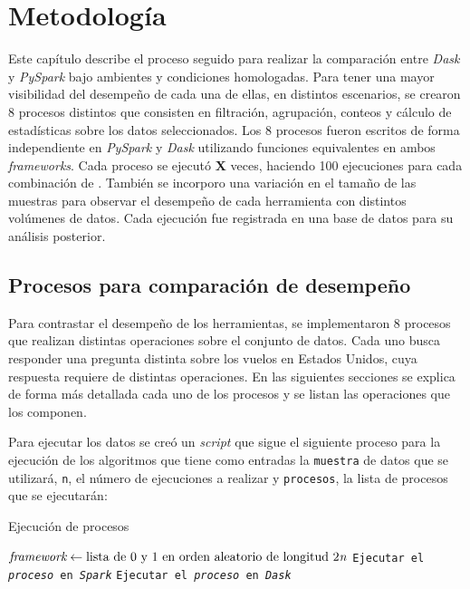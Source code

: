 \chapter{Metodología}

\noindent Este capítulo describe el proceso seguido para realizar la comparación entre \textit{Dask} y \textit{PySpark} bajo ambientes y condiciones homologadas. Para tener una mayor visibilidad del desempeño de cada una de ellas, en distintos escenarios, se crearon 8 procesos distintos que consisten en filtración, agrupación, conteos y cálculo de estadísticas sobre los datos seleccionados. Los 8 procesos fueron escritos de forma independiente en \textit{PySpark} y \textit{Dask} utilizando funciones equivalentes en ambos \textit{frameworks}. Cada proceso se ejecutó \textbf{\large X} veces, haciendo 100 ejecuciones para cada combinación de . También se incorporo una variación en el tamaño de las muestras para observar el desempeño de cada herramienta con distintos volúmenes de datos. Cada ejecución fue registrada en una base de datos para su análisis posterior. 
\newpage

\section{Procesos para comparación de desempeño}

Para contrastar el desempeño de los herramientas, se implementaron 8 procesos que realizan distintas operaciones sobre el conjunto de datos. Cada uno busca responder una pregunta distinta sobre los vuelos en Estados Unidos, cuya respuesta requiere de distintas operaciones. En las siguientes secciones se explica de forma más detallada cada uno de los procesos y se listan las operaciones que los componen.

Para ejecutar los datos se creó un \textit{script} que sigue el siguiente proceso para la ejecución de los algoritmos que tiene como entradas la \texttt{muestra} de datos que se utilizará, \texttt{n}, el número de ejecuciones a realizar y \texttt{procesos}, la lista de procesos que se ejecutarán:

\begin{algorithm}[H]
\caption{Ejecución de procesos}\label{ejecucion_procesos}
\begin{algorithmic}[1]
	\State $\textit{framework} \gets \text{lista de 0 y 1 en orden aleatorio de longitud 2\textit{n}}$
		\State \texttt{Ejecutar el \textit{proceso} en \textit{Spark}}
		\Else
		\State \texttt{Ejecutar el \textit{proceso} en \textit{Dask}}
		\EndIf
	\EndFor
\EndFor
\EndProcedure
\end{algorithmic}
\end{algorithm}

